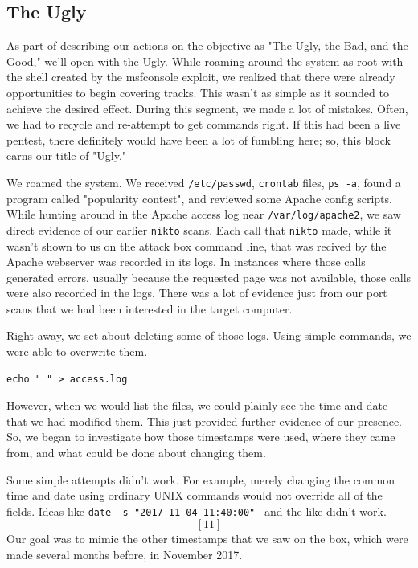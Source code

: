 \subsection{The Ugly}
As part of describing our actions on the objective as "The Ugly, the Bad, and the Good," we'll open with the Ugly.  While roaming around the system as root with the shell created by the msfconsole \gls{exploit}, we realized that there were already opportunities to begin covering tracks.  This wasn't as simple as it sounded to achieve the desired effect.  During this segment, we made a lot of mistakes.  Often, we had to recycle and re-attempt to get commands right.  If this had been a live pentest, there definitely would have been a lot of fumbling here; so, this block earns our title of "Ugly."

We roamed the system.  We received \texttt{/etc/passwd}, \texttt{crontab} files, \texttt{ps -a}, found a program called "popularity contest", and reviewed some Apache config scripts.  While hunting around in the Apache access log near \texttt{/var/log/apache2}, we saw direct evidence of our earlier \texttt{nikto} scans.  Each call that \texttt{nikto} made, while it wasn't shown to us on the \gls{attack} box command line, that was recived by the Apache webserver was recorded in its logs.  In instances where those calls generated errors, usually because the requested page was not available, those calls were also recorded in the logs.  There was a lot of evidence just from our port scans that we had been interested in the target computer.


Right away, we set about deleting some of those logs.  Using simple commands, we were able to overwrite them.

\begin{lstlisting}
echo " " > access.log
\end{lstlisting}


However, when we would list the files, we could plainly see the time and date that we had modified them.  This just provided further evidence of our presence.  So, we began to investigate how those timestamps were used, where they came from, and what could be done about changing them.

Some simple attempts didn't work.  For example, merely changing the common time and date using ordinary UNIX commands would not override all of the fields.  Ideas like \texttt{date -s "2017-11-04 11:40:00" } and the like didn't work. \[[11]\] Our goal was to mimic the other timestamps that we saw on the box, which were made several months before, in November 2017. 


